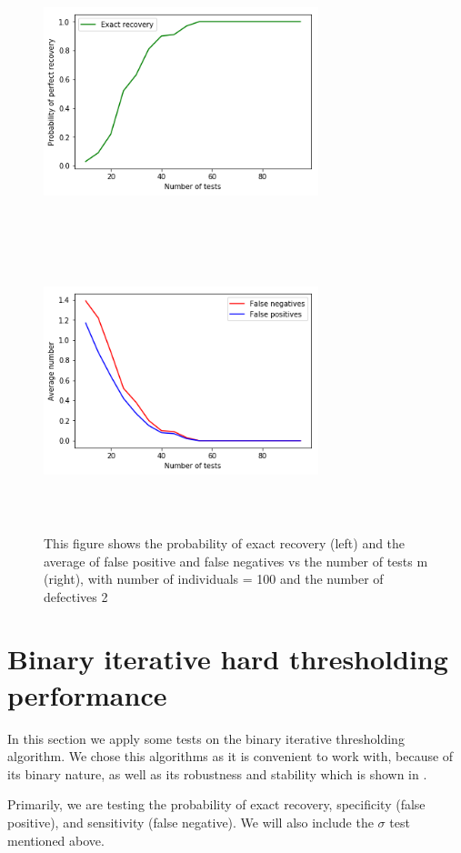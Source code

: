\begin{figure}[H]
	\includegraphics[height=8cm, width=8cm]{images/basic_exa}
	\includegraphics[height=8cm, width=8cm]{images/basic_false}
	\caption{This figure shows the probability of exact recovery (left) and  the average of false positive and false negatives vs the number of tests m (right), with number of individuals  = 100 and the number of defectives 2}
\end{figure}

\section{Binary iterative hard thresholding performance}

In this section we apply some tests on the binary iterative thresholding algorithm. We chose this algorithms as it is convenient to work with, because of its binary nature, as well as its robustness and stability which is shown in \cite{biht}. 

Primarily, we are testing the probability of exact recovery, specificity (false positive), and sensitivity (false negative). We will also include the $ \sigma $ test mentioned above. 

